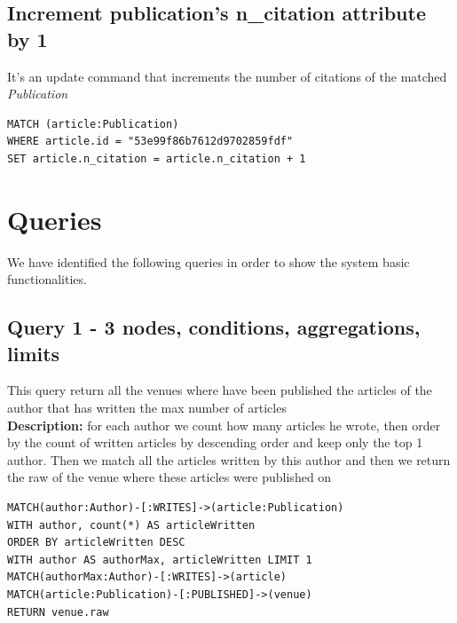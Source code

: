 \documentclass{Configuration_Files/PoliMi3i_thesis}
\begin{document}
\subsection{Increment publication's n\_citation attribute by 1}
It's an update command that increments the number of citations of the matched \emph{Publication}
\begin{lstlisting}[language=cypher, label=lst:cypher-example]
MATCH (article:Publication)
WHERE article.id = "53e99f86b7612d9702859fdf"
SET article.n_citation = article.n_citation + 1
\end{lstlisting}

\section{Queries}
We have identified the following queries in order to show the system basic functionalities.

\subsection{Query 1 - 3 nodes, conditions, aggregations, limits }
This query return all the venues where have been published the articles of the author that has written the max number of articles\\
\textbf{Description:} for each author we count how many articles he wrote, then order by the count of written articles by descending order and keep only the top 1 author.
Then we match all the articles written by this author and then we return the raw of the venue where these articles were published on
\begin{lstlisting}[language=cypher, label=lst:cypher-example]
MATCH(author:Author)-[:WRITES]->(article:Publication)
WITH author, count(*) AS articleWritten
ORDER BY articleWritten DESC
WITH author AS authorMax, articleWritten LIMIT 1
MATCH(authorMax:Author)-[:WRITES]->(article)
MATCH(article:Publication)-[:PUBLISHED]->(venue)
RETURN venue.raw
\end{lstlisting}
\end{document}
